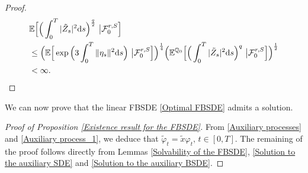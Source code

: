 \documentclass[12,reqno]{amsart}
\numberwithin{equation}{section}
\begin{document}
\begin{proof}
	\begin{align*}
		&\mathbb{E}\Big[\Big(\int_{0}^{T}|\tilde{Z}_{s}|^{2}\mathrm{d}s\Big)^{\frac{q}{2}}~\big|\mathcal{F}_{0}^{r,S}\Big]\notag\\
		&\le\Big(\mathbb{E}\Big[\exp\Big(3\int_{0}^{T}\|\eta_{s}\|^{2}\mathrm{d}s\Big)~\big|\mathcal{F}_{0}^{r,S}\Big]\Big)^{\frac{1}{4}}\Big(\mathbb{E}^{\mathbb{Q}_{0}}\Big[\Big(\int_{0}^{T}|\tilde{Z}_{s} |^{2}\mathrm{d}s\Big)^{q}~\big|\mathcal{F}_{0}^{r,S}\Big]\Big)^{\frac{1}{2}}\notag\\
		&<\infty.
	\end{align*}
\end{proof}

We can now prove that the linear FBSDE \eqref{Optimal FBSDE} admits a solution.
\begin{proof}[Proof of Proposition \ref{Existence result for the FBSDE}]
	From \eqref{Auxiliary processes} and \eqref{Auxiliary process_1}, we deduce that $\widetilde{\varphi}_{t}=\widetilde{x}\varphi_{t},\,t\in[0,T]$. The remaining of the proof follows directly from Lemmas \ref{Solvability of the FBSDE}, \ref{Solution to the auxiliary SDE} and \ref{Solution to the auxiliary BSDE}.
\end{proof}
\end{document}
